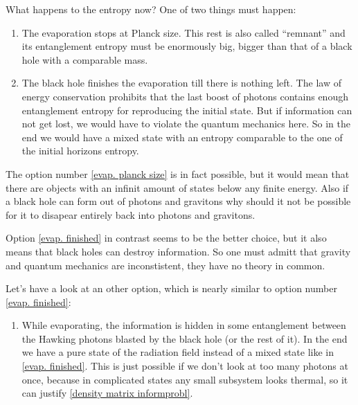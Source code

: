 	What happens to the entropy now? One of two things must happen:
		\begin{enumerate}[(1)]
			\item The evaporation stops at Planck size. This rest is also called ``remnant'' and its entanglement entropy must be enormously big, bigger than that of a black hole with a comparable mass. \label{evap. planck size}
			\item The black hole finishes the evaporation till there is nothing left. The law of energy conservation prohibits that the last boost of photons contains enough entanglement entropy for reproducing the initial state. But if information can not get lost, we would have to violate the quantum mechanics here.
			So in the end we would have a mixed state with an entropy comparable to the one of the initial horizons entropy. \label{evap. finished}
		\end{enumerate}
	The option number \eqref{evap. planck size} is in fact possible, but it would mean that there are objects with an infinit amount of states below any finite energy.
	Also if a black hole can form out of photons and gravitons why should it not be possible for it to disapear entirely back into photons and gravitons.
	
	Option \eqref{evap. finished} in contrast seems to be the better choice, but it also means that black holes can destroy information. So one must admitt that gravity and quantum mechanics are inconstistent, they have no theory in common.
	
	Let's have a look at an other option, which is nearly similar to option number \eqref{evap. finished}:
		\begin{enumerate}[(3)]
			\item While evaporating, the information is hidden in some entanglement between the Hawking photons blasted by the black hole (or the rest of it).
			In the end we have a pure state of the radiation field instead of a mixed state like in \eqref{evap. finished}. This is just possible if we don't look at too many photons at once, because in complicated states any small subsystem looks thermal, so it can justify \eqref{density matrix informprobl}. 		
		\end{enumerate}				
		